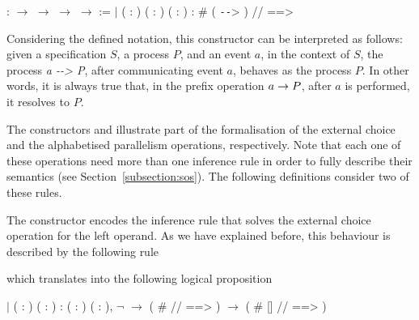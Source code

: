 \begin{coqdoccode}
	\coqdocnoindent
	  :  \ensuremath{\rightarrow}  \ensuremath{\rightarrow}  \ensuremath{\rightarrow}  \ensuremath{\rightarrow}  :=\coqdoceol
	\coqdocindent{1.00em}
	\ensuremath{|}  ( : ) ( : ) ( : ) :\coqdoceol
	\coqdocindent{1.50em}
	 \# ( \texttt{-{}-}> ) //   ==> \coqdoceol
\end{coqdoccode}

Considering the defined notation, this constructor can be interpreted as follows: given a specification $ S $, a process $ P $, and an event $ a $, in the context of $ S $, the process \emph{a -{}-> P}, after communicating event $ a $, behaves as the process $ P $. In other words, it is always true that, in the prefix operation $ a \mathrel{\rightarrow} P $, after $ a $ is performed, it resolves to $ P $.

The constructors  and  illustrate part of the formalisation of the external choice and the alphabetised parallelism operations, respectively. Note that each one of these operations need more than one inference rule in order to fully describe their semantics (see Section~\ref{subsection:sos}). The following definitions consider two of these rules.

The  constructor encodes the inference rule that solves the external choice operation for the left operand. As we have explained before, this behaviour is described by the following rule \
%
\begin{prooftree}
\end{prooftree}
%
which translates into the following logical proposition

\begin{coqdoccode}
	\coqdocnoindent
	\ensuremath{|}  ( : ) (  : ) :\coqdoceol
	\coqdocindent{1.00em}
	\coqdockw{\ensuremath{\forall}} ( : ) ( : ),\coqdoceol
	\coqdocindent{3.00em}
	\ensuremath{\lnot}    \ensuremath{\rightarrow}\coqdoceol
	\coqdocindent{3.00em}
	( \#  //  ==> ) \ensuremath{\rightarrow}\coqdoceol
	\coqdocindent{3.00em}
	( \#  []  //  ==> )
\end{coqdoccode}

